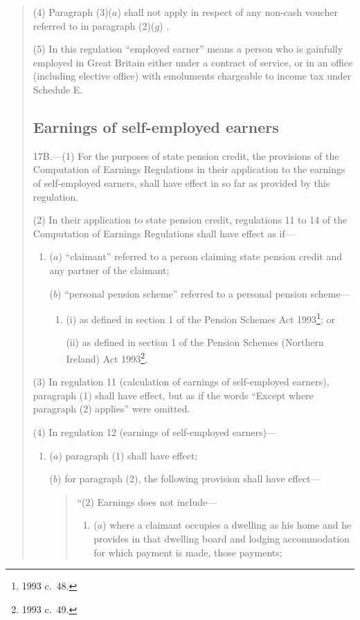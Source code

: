 \documentclass[12pt,a4paper]{article}
\begin{document}
\begin{enumerate}
\begin{quotation}
(4) Paragraph (3)($a$)  shall not apply in respect of any non-cash voucher referred to in paragraph (2)($g$) .

(5) In this regulation “employed earner” means a person who is gainfully employed in Great Britain either under a contract of service, or in an office (including elective office) with emoluments chargeable to income tax under Schedule E.

\subsection*{Earnings of self-employed earners}

17B.---(1)  For the purposes of state pension credit, the provisions of the Computation of Earnings Regulations in their application to the earnings of self-employed earners, shall have effect in so far as provided by this regulation.

(2) In their application to state pension credit, regulations 11 to 14 of the Computation of Earnings Regulations shall have effect as if—
\begin{enumerate}\item[]
($a$) “claimant” referred to a person claiming state pension credit and any partner of the claimant;

($b$) “personal pension scheme” referred to a personal pension scheme—
\begin{enumerate}\item[]
(i) as defined in section 1 of the Pension Schemes Act 1993\footnote{1993 c.\ 48.}; or

(ii) as defined in section 1 of the Pension Schemes (Northern Ireland) Act 1993\footnote{1993 c.\ 49.}.
\end{enumerate}
\end{enumerate}

(3) In regulation 11 (calculation of earnings of self-employed earners), paragraph (1) shall have effect, but as if the words “Except where paragraph (2) applies” were omitted.

(4) In regulation 12 (earnings of self-employed earners)—
\begin{enumerate}\item[]
($a$) paragraph (1) shall have effect;

($b$) for paragraph (2), the following provision shall have effect—
\begin{quotation}
“(2) Earnings does not include—
\begin{enumerate}\item[]
($a$) where a claimant occupies a dwelling as his home and he provides in that dwelling board and lodging accommodation for which payment is made, those payments;


\end{enumerate}
\end{quotation}
\end{enumerate}
\end{quotation}
\end{enumerate}
\end{document}
